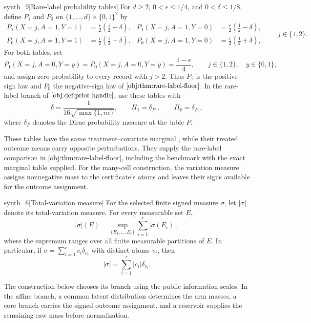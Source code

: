 \documentclass[11pt]{article}
\begin{document}
\begingroup\small
\begin{definitionv}{synth_9}[Rare-label probability tables]
For \(d\ge2\), \(0<\epsilon\le1/4\), and \(0<\delta\le1/8\), define \(P_1\) and \(P_0\) on \(\{1,\ldots,d\}\times\{0,1\}^2\) by
\[
\begin{aligned}
P_1(X=j,A=1,Y=1)&=\frac{\epsilon}{2}\left(\frac12+\delta\right),&
P_1(X=j,A=1,Y=0)&=\frac{\epsilon}{2}\left(\frac12-\delta\right),\\
P_0(X=j,A=1,Y=1)&=\frac{\epsilon}{2}\left(\frac12-\delta\right),&
P_0(X=j,A=1,Y=0)&=\frac{\epsilon}{2}\left(\frac12+\delta\right),
\end{aligned}
\qquad j\in\{1,2\}.
\]
For both tables, set
\[
P_1(X=j,A=0,Y=y)=P_0(X=j,A=0,Y=y)=\frac{1-\epsilon}{4},
\qquad j\in\{1,2\},\quad y\in\{0,1\},
\]
and assign zero probability to every record with \(j>2\).
Thus \(P_1\) is the positive-sign law and \(P_0\) the negative-sign law of \(\cref{obj:thm:rare-label-floor}\). In the rare-label branch of \(\cref{obj:def:prior-handle}\), use these tables with
\[
\delta=\frac{1}{16\sqrt{\max\{1,n\epsilon\}}},
\qquad
\Pi_1=\delta_{P_1},\qquad \Pi_0=\delta_{P_0},
\]
where \(\delta_P\) denotes the Dirac probability measure at the table \(P\).
\end{definitionv}
\endgroup

These tables have the same treatment--covariate marginal , while their treated outcome means carry opposite perturbations. They supply the rare-label comparison in \cref{obj:thm:rare-label-floor}, including the benchmark with the exact marginal table supplied. For the many-cell construction, the variation measure assigns nonnegative mass to the certificate's atoms and leaves their signs available for the outcome assignment.

\begin{definitionv}{synth_6}[Total-variation measure]
For the selected finite signed measure \(\sigma\), let \(|\sigma|\) denote its total-variation measure. For every measurable set \(E\),
\[
|\sigma|(E)=\sup_{\{E_1,\ldots,E_r\}}\sum_{i=1}^{r}|\sigma(E_i)|,
\]
where the supremum ranges over all finite measurable partitions of \(E\). In particular, if \(\sigma=\sum_{i=1}^{r}c_i\delta_{v_i}\) with distinct atoms \(v_i\), then
\[
|\sigma|=\sum_{i=1}^{r}|c_i|\delta_{v_i}.
\]
\end{definitionv}

The construction below chooses its branch using the public information scales. In the affine branch, a common latent distribution determines the arm masses, a core branch carries the signed outcome assignment, and a reservoir supplies the remaining raw mass before normalization.
\end{document}
